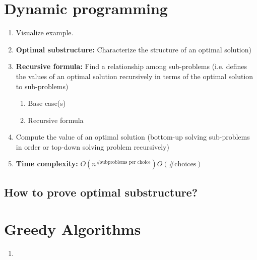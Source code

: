 \documentclass{article}
\begin{document}
\section{Dynamic programming}
\begin{process}
    \begin{enumerate}
        \item Visualize example. 
        \item \textbf{Optimal substructure:} Characterize the structure of an optimal solution)
        \item \textbf{Recursive formula:} Find a relationship among sub-problems (i.e. defines the values of an optimal solution recursively in terms of the optimal solution to sub-problems)
        \begin{enumerate}
            \item Base case(s)
            \item Recursive formula 
        \end{enumerate}
        \item Compute the value of an optimal solution (bottom-up solving sub-problems in order or top-down solving problem recursively)
        \item \textbf{Time complexity:} $O(n^{\text{\# subproblems per choice}}) O(\text{\# choices})$
    \end{enumerate}
\end{process}

\subsection{How to prove optimal substructure?}
\begin{process}
    
\end{process}

\begin{example}
    
\end{example}
\newpage

\section{Greedy Algorithms}
\begin{process}
    \begin{enumerate}
        \item 
    \end{enumerate}
\end{process}

\begin{example}
    
\end{example}
\end{document}
